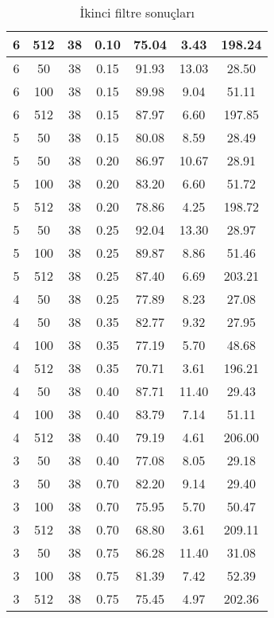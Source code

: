 \begin{table}
{\begin{tabular}{ | c | c | c | c | c | c | c |}
6 & 512 & 38 & 0.10 & 75.04 & 3.43 & 198.24 \\ \hline
6 & 50 & 38 & 0.15 & 91.93 & 13.03 & 28.50 \\ \hline
6 & 100 & 38 & 0.15 & 89.98 & 9.04 & 51.11 \\ \hline
6 & 512 & 38 & 0.15 & 87.97 & 6.60 & 197.85 \\ \hline
5 & 50 & 38 & 0.15 & 80.08 & 8.59 & 28.49 \\ \hline
5 & 50 & 38 & 0.20 & 86.97 & 10.67 & 28.91 \\ \hline
5 & 100 & 38 & 0.20 & 83.20 & 6.60 & 51.72 \\ \hline
5 & 512 & 38 & 0.20 & 78.86 & 4.25 & 198.72 \\ \hline
5 & 50 & 38 & 0.25 & 92.04 & 13.30 & 28.97 \\ \hline
5 & 100 & 38 & 0.25 & 89.87 & 8.86 & 51.46 \\ \hline
5 & 512 & 38 & 0.25 & 87.40 & 6.69 & 203.21 \\ \hline
4 & 50 & 38 & 0.25 & 77.89 & 8.23 & 27.08 \\ \hline
4 & 50 & 38 & 0.35 & 82.77 & 9.32 & 27.95 \\ \hline
4 & 100 & 38 & 0.35 & 77.19 & 5.70 & 48.68 \\ \hline
4 & 512 & 38 & 0.35 & 70.71 & 3.61 & 196.21 \\ \hline
4 & 50 & 38 & 0.40 & 87.71 & 11.40 & 29.43 \\ \hline
4 & 100 & 38 & 0.40 & 83.79 & 7.14 & 51.11 \\ \hline
4 & 512 & 38 & 0.40 & 79.19 & 4.61 & 206.00 \\ \hline
3 & 50 & 38 & 0.40 & 77.08 & 8.05 & 29.18 \\ \hline
3 & 50 & 38 & 0.70 & 82.20 & 9.14 & 29.40 \\ \hline
3 & 100 & 38 & 0.70 & 75.95 & 5.70 & 50.47 \\ \hline
3 & 512 & 38 & 0.70 & 68.80 & 3.61 & 209.11 \\ \hline
3 & 50 & 38 & 0.75 & 86.28 & 11.40 & 31.08 \\ \hline
3 & 100 & 38 & 0.75 & 81.39 & 7.42 & 52.39 \\ \hline
3 & 512 & 38 & 0.75 & 75.45 & 4.97 & 202.36 \\ \hline
\end{tabular}
\caption{İkinci filtre sonuçları}
\label{table:results2}
}
\end{table}